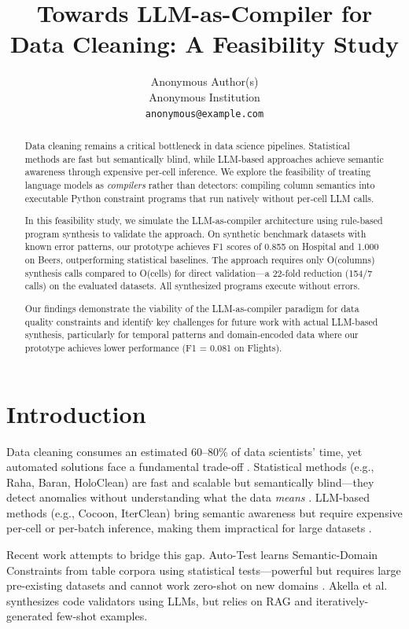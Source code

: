 \documentclass{article}
\title{Towards LLM-as-Compiler for Data Cleaning: A Feasibility Study}
\author{%
Anonymous Author(s)\\
Anonymous Institution\\
\texttt{anonymous@example.com}
}
\begin{document}
\maketitle

\begin{abstract}
Data cleaning remains a critical bottleneck in data science pipelines. Statistical methods are fast but semantically blind, while LLM-based approaches achieve semantic awareness through expensive per-cell inference. We explore the feasibility of treating language models as \textit{compilers} rather than detectors: compiling column semantics into executable Python constraint programs that run natively without per-cell LLM calls.

In this feasibility study, we simulate the LLM-as-compiler architecture using rule-based program synthesis to validate the approach. On synthetic benchmark datasets with known error patterns, our prototype achieves F1 scores of 0.855 on Hospital and 1.000 on Beers, outperforming statistical baselines. The approach requires only O(columns) synthesis calls compared to O(cells) for direct validation---a 22-fold reduction (154/7 calls) on the evaluated datasets. All synthesized programs execute without errors.

Our findings demonstrate the viability of the LLM-as-compiler paradigm for data quality constraints and identify key challenges for future work with actual LLM-based synthesis, particularly for temporal patterns and domain-encoded data where our prototype achieves lower performance (F1 = 0.081 on Flights).
\end{abstract}

\section{Introduction}
\label{sec:introduction}

Data cleaning consumes an estimated 60--80\% of data scientists' time, yet automated solutions face a fundamental trade-off \citep{mahdavi2019raha, mahdavi2020baran}. Statistical methods (e.g., Raha, Baran, HoloClean) are fast and scalable but semantically blind---they detect anomalies without understanding what the data \textit{means} \citep{rekatsinas2017holoclean}. LLM-based methods (e.g., Cocoon, IterClean) bring semantic awareness but require expensive per-cell or per-batch inference, making them impractical for large datasets \citep{huang2024cocoon, ni2024iterclean}.

Recent work attempts to bridge this gap. Auto-Test learns Semantic-Domain Constraints from table corpora using statistical tests---powerful but requires large pre-existing datasets and cannot work zero-shot on new domains \citep{he2025autotest}. Akella et al. \citep{akella2025quality} synthesizes code validators using LLMs, but relies on RAG and iteratively-generated few-shot examples.
\end{document}
